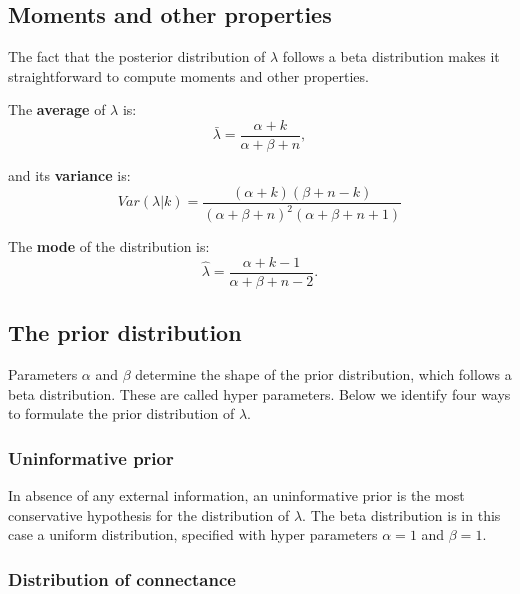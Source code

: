 \documentclass[12pt]{article}
\begin{document}
    \subsection*{Moments and other properties}

      The fact that the posterior distribution of $\lambda$ follows a beta distribution makes it straightforward to compute moments and other properties. 

      The \textbf{average} of $\lambda$ is: 
          \begin{equation}
            \bar{\lambda} = \frac{\alpha+k}{\alpha+\beta+n} ,
            \label{mean}
          \end{equation}

        and its \textbf{variance} is:  
          \begin{equation}
            Var(\lambda|k) = \frac{(\alpha + k)(\beta + n - k)}{(\alpha + \beta + n)^{2}(\alpha + \beta + n +1)}
            \label{variance}
          \end{equation}

        The \textbf{mode} of the distribution is:
          \begin{equation}
            \hat{\lambda} = \frac{\alpha + k - 1}{\alpha + \beta + n - 2} .
            \label{mode}
          \end{equation}

    \subsection*{The prior distribution}    

      Parameters $\alpha$ and $\beta$ determine the shape of the prior distribution, which follows a beta distribution. These are called hyper parameters. Below we identify four ways to formulate the prior distribution of $\lambda$. 

      \subsubsection*{Uninformative prior}
        
          In absence of any external information, an uninformative prior is the most conservative hypothesis for the distribution of $\lambda$. The beta distribution is in this case a uniform distribution, specified with hyper parameters $\alpha=1$ and $\beta=1$. 

      \subsubsection*{Distribution of connectance}
        
\end{document}
